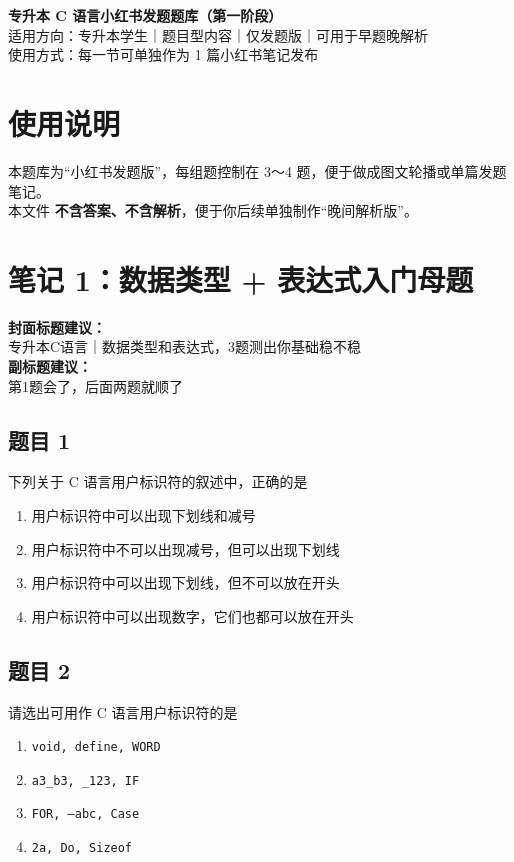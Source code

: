 \documentclass[12pt,a4paper]{ctexart}
\begin{document}
\begin{center}
    {\LARGE \textbf{专升本 C 语言小红书发题题库（第一阶段）}}\\[0.6em]
    {\large 适用方向：专升本学生｜题目型内容｜仅发题版｜可用于早题晚解析}\\[0.8em]
    {\normalsize 使用方式：每一节可单独作为 1 篇小红书笔记发布}
\end{center}

\vspace{1em}

\section*{使用说明}
本题库为“小红书发题版”，每组题控制在 3～4 题，便于做成图文轮播或单篇发题笔记。\\
本文件 \textbf{不含答案、不含解析}，便于你后续单独制作“晚间解析版”。

\newpage

\section{笔记 1：数据类型 + 表达式入门母题}
\begin{coverbox}
\textbf{封面标题建议：}\\
专升本C语言｜数据类型和表达式，3题测出你基础稳不稳\\
\textbf{副标题建议：}\\
第1题会了，后面两题就顺了
\end{coverbox}

\subsection*{题目 1}
下列关于 C 语言用户标识符的叙述中，正确的是
\begin{enumerate}[label=\Alph*.]
    \item 用户标识符中可以出现下划线和减号
    \item 用户标识符中不可以出现减号，但可以出现下划线
    \item 用户标识符中可以出现下划线，但不可以放在开头
    \item 用户标识符中可以出现数字，它们也都可以放在开头
\end{enumerate}

\subsection*{题目 2}
请选出可用作 C 语言用户标识符的是
\begin{enumerate}[label=\Alph*.]
    \item \texttt{void, define, WORD}
    \item \texttt{a3\_b3, \_123, IF}
    \item \texttt{FOR, --abc, Case}
    \item \texttt{2a, Do, Sizeof}
\end{enumerate}
\end{document}
